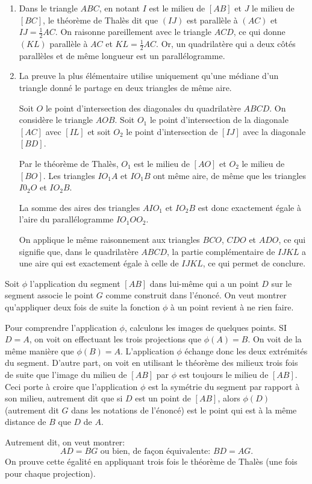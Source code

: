 \begin{Soln}{98}
\begin{enumerate}
\item
Dans le triangle $ABC$, en notant $I$ est le milieu de $[AB]$ et $J$ le milieu de $[BC]$, le théorème de Thalès dit que $(IJ)$ est parall\`ele \`a $(AC)$ et $IJ = \frac{1}{2} AC$. On raisonne pareillement avec le triangle $ACD$, ce qui donne $(KL)$ parall\`ele \`a $AC$ et $KL = \frac{1}{2} AC$. Or, un quadrilat\`ere qui a deux c\^ot\'es parall\`eles et de m\^eme longueur est un parall\'elogramme.

\item La preuve la plus élémentaire utilise uniquement qu'une médiane d'un triangle donné le partage en deux triangles de même aire.

Soit $O$ le point d'intersection des diagonales du quadrilat\`ere $ABCD$. On consid\`ere le triangle $AOB$. Soit $O_1$ le point d'intersection de la diagonale $[AC]$ avec $[IL]$ et soit $O_2$ le point d'intersection de $[IJ]$ avec la diagonale $[BD]$.


Par le théorème de Thalès,  $O_1$ est le milieu de $[AO]$ et $O_2$ le milieu de $[BO]$. Les triangles $IO_1A$ et $IO_1B$ ont même aire, de même que les triangles $I0_2O$ et $IO_2B$.

La somme des aires des triangles $AIO_1$ et $IO_2B$ est donc exactement \'egale \`a l'aire du parall\'elogramme $IO_1OO_2$.

On applique le m\^eme raisonnement aux triangles $BCO$, $CDO$ et $ADO$, ce qui signifie que, dans le quadrilat\`ere $ABCD$, la partie compl\'ementaire de $IJKL$ a une aire qui est exactement \'egale \`a celle de $IJKL$, ce qui permet de conclure. \end{enumerate}

\end{Soln}
\begin{Soln}{99}
Soit $\phi$ l'application du segment $[AB]$ dans lui-même qui a un point $D$ sur le segment associe le point $G$ comme construit dans l'énoncé. On veut montrer qu'appliquer deux fois de suite la fonction $\phi$ à un point revient à ne rien faire.

Pour comprendre l'application $\phi$, calculons les images de quelques points.
SI $D=A$, on voit on effectuant les trois projections que $\phi(A)=B$. On voit de la même manière que $\phi(B)=A$. L'application $\phi$ échange donc les deux extrémités du segment. D'autre part, on voit en utilisant le théorème des milieux trois fois de suite que l'image du milieu de $[AB]$ par $\phi$ est toujours le milieu de $[AB]$. Ceci porte à croire que l'application $\phi$ est la symétrie du segment par rapport à son milieu, autrement dit que si $D$ est un point de $[AB]$, alors $\phi(D)$ (autrement dit $G$ dans les notations de l'énoncé) est le point qui est à la même distance de $B$ que $D$ de $A$.

Autrement dit, on veut montrer:
\[ AD=BG\text{ ou bien, de façon équivalente: } BD =AG.\]
On prouve cette égalité en appliquant trois fois le théorème de Thalès (une fois pour chaque projection).
\end{Soln}
